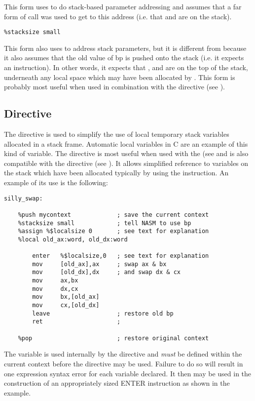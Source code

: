This form uses  to do stack-based parameter addressing and
assumes that a far form of call was used to get to this address
(i.e. that  and  are on the stack).

\begin{lstlisting}
%stacksize small
\end{lstlisting}

This form also uses  to address stack parameters, but it is
different from  because it also assumes that the old value
of bp is pushed onto the stack (i.e. it expects an 
instruction). In other words, it expects that ,  and
 are on the top of the stack, underneath any local space which
may have been allocated by . This form is probably most
useful when used in combination with the  directive
(see ).


\subsection{ Directive}
\label{subsec:local}

The  directive is used to simplify the use of local
temporary stack variables allocated in a stack frame. Automatic
local variables in C are an example of this kind of variable. The
 directive is most useful when used with the 
(see  and is also compatible with the  directive
(see ). It allows simplified reference to variables on the
stack which have been allocated typically by using the 
instruction.
An example of its use is the following:

\begin{lstlisting}
silly_swap:

    %push mycontext             ; save the current context
    %stacksize small            ; tell NASM to use bp
    %assign %$localsize 0       ; see text for explanation
    %local old_ax:word, old_dx:word

        enter   %$localsize,0   ; see text for explanation
        mov     [old_ax],ax     ; swap ax & bx
        mov     [old_dx],dx     ; and swap dx & cx
        mov     ax,bx
        mov     dx,cx
        mov     bx,[old_ax]
        mov     cx,[old_dx]
        leave                   ; restore old bp
        ret                     ;

    %pop                        ; restore original context
\end{lstlisting}

The  variable is used internally by the
 directive and \emph{must} be defined within the
current context before the  directive may be used.
Failure to do so will result in one expression syntax error for
each  variable declared. It then may be used in
the construction of an appropriately sized ENTER instruction
as shown in the example.
